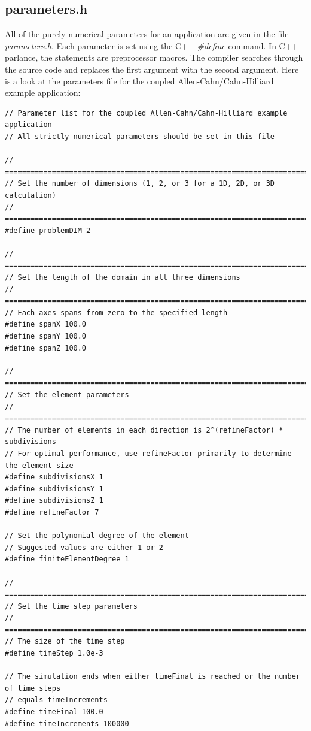 \documentclass[10pt]{article} %
\begin{document}
\subsection{parameters.h} \label{parameters}
All of the purely numerical parameters for an application are given in the file \emph{parameters.h}. Each parameter is set using the C++ \emph{\#define} command. In C++ parlance, the statements are preprocessor macros. The compiler searches through the source code and replaces the first argument with the second argument. Here is a look at the parameters file for the coupled Allen-Cahn/Cahn-Hilliard example application:
\tiny
\begin{lstlisting}
// Parameter list for the coupled Allen-Cahn/Cahn-Hilliard example application
// All strictly numerical parameters should be set in this file

// =================================================================================
// Set the number of dimensions (1, 2, or 3 for a 1D, 2D, or 3D calculation)
// =================================================================================
#define problemDIM 2

// =================================================================================
// Set the length of the domain in all three dimensions
// =================================================================================
// Each axes spans from zero to the specified length
#define spanX 100.0
#define spanY 100.0
#define spanZ 100.0

// =================================================================================
// Set the element parameters
// =================================================================================
// The number of elements in each direction is 2^(refineFactor) * subdivisions
// For optimal performance, use refineFactor primarily to determine the element size
#define subdivisionsX 1
#define subdivisionsY 1
#define subdivisionsZ 1
#define refineFactor 7

// Set the polynomial degree of the element
// Suggested values are either 1 or 2
#define finiteElementDegree 1

// =================================================================================
// Set the time step parameters
// =================================================================================
// The size of the time step
#define timeStep 1.0e-3

// The simulation ends when either timeFinal is reached or the number of time steps
// equals timeIncrements
#define timeFinal 100.0
#define timeIncrements 100000


\end{lstlisting}
\end{document}
